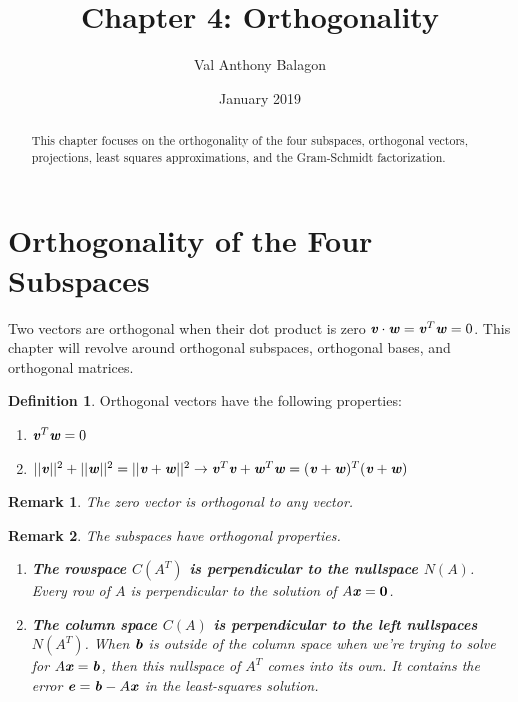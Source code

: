 \documentclass[12pt, letterpaper]{article}
\author{Val Anthony Balagon}
\date{January 2019}
\title{Chapter 4: Orthogonality}
\newcommand{\V}[1]{\textbf{\textit{#1}}}
\newcommand{\DefinitionSpace}{\vspace{15px}}
\newtheorem*{remark}{Remark}
\theoremstyle{definition}
\newtheorem{definition}{Definition}[section]
\begin{document}
	\maketitle
	\begin{abstract}
		This chapter focuses on the orthogonality of the four subspaces, orthogonal vectors, projections, least squares approximations, and the Gram-Schmidt factorization.
	\end{abstract}

\section{Orthogonality of the Four Subspaces}

	Two vectors are orthogonal when their dot product is zero $\V{v} \cdot \V{w} = \V{v}^T \V{w} = 0$. This chapter will revolve around orthogonal subspaces, orthogonal bases, and orthogonal matrices.
	
	\DefinitionSpace
	\begin{definition}
		Orthogonal vectors have the following properties:
		\renewcommand{\theenumi}{\roman{enumi}}
		
		\begin{enumerate}[leftmargin=2\parindent]
			\item $\V{v}^T \V{w} = 0$
			\item $||\V{v}||^2 + ||\V{w}||^2 = ||\V{v} + \V{w}||^2 \rightarrow \V{v}^T\V{v} + \V{w}^T\V{w} = (\V{v}+\V{w})^T(\V{v}+\V{w})$
		\end{enumerate}	
	
	\end{definition} 	
	
	\DefinitionSpace
	\begin{remark}
		The zero vector is orthogonal to any vector.
	\end{remark}
	

	\DefinitionSpace
	\begin{remark}
		The subspaces have orthogonal properties. 
		\begin{enumerate}
			\item \textbf{The rowspace $C(A^T)$ is perpendicular to the nullspace $N(A)$}. Every row of $A$ is perpendicular to the solution of $A\V{x} = \textbf{0}$.
			\item \textbf{The column space $C(A)$ is perpendicular to the left nullspaces $N(A^T)$}. When $\V{b}$ is outside of the column space when we're trying to solve for $A\V{x} = \V{b}$, then this nullspace of $A^T$ comes into its own. It contains the error $\V{e} = \V{b} - A\V{x}$ in the least-squares solution.
		\end{enumerate}
	\end{remark}
	\DefinitionSpace
	
\end{document}

